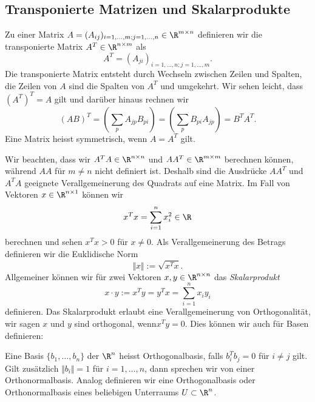 \documentclass[letterpaper,10pt,english]{jupyterBook}
\begin{document}
\subsection{Transponierte Matrizen und Skalarprodukte}
\label{\detokenize{vektorraeume/LGS:transponierte-matrizen-und-skalarprodukte}}
Zu einer Matrix \(A=(A_{ij})_{i=1,\ldots,m;j=1,\ldots,n} \in \R^{m \times n}\) definieren wir die transponierte Matrix \(A^T
\in \R^{n \times m} \) als
\begin{equation*}
 A^T =  (A_{ji})_{i=1,\ldots,n;j=1,\ldots,m}.
\end{equation*}
Die transponierte Matrix entsteht durch Wechseln zwischen Zeilen und Spalten, die Zeilen von \(A\) sind die Spalten von \(A^T\) und umgekehrt. Wir sehen leicht, dass \((A^T)^T = A \) gilt und darüber hinaus rechnen wir
\begin{equation*}
 (AB)^T = (\sum_{p } A_{jp} B_{pi} ) = (\sum_{p } B_{pi} A_{jp}  ) = B^T A^T.
\end{equation*}
Eine Matrix heisst symmetrisch, wenn \(A=A^T\) gilt.

Wir beachten, dass wir \(A^T A \in \R^{n \times n}\) und \(AA^T \in \R^{m \times m}\) berechnen können, während \(A A \) für \(m \neq n\) nicht definiert ist. Deshalb sind die Ausdrücke \(AA^T\) und \(A^T A\)  geeignete Verallgemeinerung des Quadrats auf eine Matrix. Im Fall von Vektoren \(x \in \R^{n \times 1}\) können wir
\begin{equation*}
 x^T x = \sum_{i=1}^n x_i^2 \in \R
\end{equation*}
berechnen und sehen \(x^T x > 0\) für \(x \neq 0.\)  Als Verallgemeinerung des Betrags definieren wir die Euklidische Norm
\begin{equation*}
 \Vert x \Vert := \sqrt{x^T x}.
\end{equation*}
Allgemeiner können wir für zwei Vektoren \(x,y \in \R^{n \times n}\) das \emph{Skalarprodukt}
\begin{equation*}
 x \cdot y := x^T y = y^T x =  \sum_{i=1}^n x_i y_i
\end{equation*}
definieren. Das Skalarprodukt erlaubt eine Verallgemeinerung von Orthogonalität, wir sagen \(x\) und \(y\) sind orthogonal, wenn\( x^T y  = 0.\) Dies können wir auch für Basen definieren:
\label{vektorraeume/LGS:definition-4}
\begin{definition}{}{}



Eine Basis \(\{b_1,\ldots,b_n\}\) der \(\R^n\) heisst Orthogonalbasis, falls \(b_i^T b_j = 0\) für \(i \neq j\) gilt. Gilt zusätzlich \(\Vert b_i \Vert=1\) für \(i=1,\ldots,n\), dann sprechen wir von einer Orthonormalbasis. Analog definieren wir eine Orthogonalbasis oder Orthonormalbasis eines beliebigen Unterraums \(U \subset \R^n\).
\end{definition}
\end{document}
